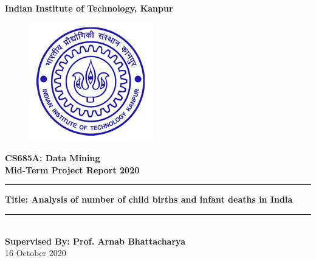 \documentclass[]{article}
\begin{document}
\begin{titlepage}
\begin{center}

    \textbf{\LARGE \vspace*{15pt}Indian Institute of Technology, Kanpur}
\end{center}
\begin{figure}[h]
\centering
\includegraphics[scale=0.7]{bluelog.jpg}
\end{figure}
    \begin{center}
    \textbf{\Large CS685A: Data Mining\\
        Mid-Term Project Report 2020\\}
\end{center}


\begin{center}
\vspace{1 cm}
\rule{\textwidth}{2pt}\linebreak
\Large
\textbf{Title: Analysis of number of child births and infant deaths in India}
\rule{\textwidth}{2pt}\\
\vspace{2.5 cm}
\Large
\textbf{Supervised By: Prof. Arnab Bhattacharya}\\
\vspace{2.5cm}
\normalsize{16 October 2020}
    
\end{center}
\end{titlepage}
\newpage
\end{document}
